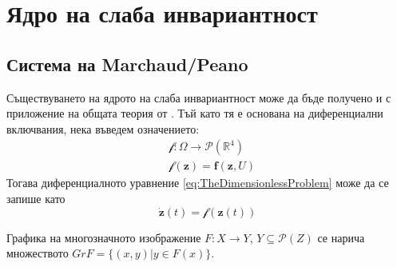 \section{\hspace{1em} Ядро на слаба инвариантност}

\subsection{Система на Marchaud/Peano}
Съществуването на ядрото на слаба инвариантност може да бъде получено и с приложение на общата теория от \cite{Aubin1991}.
Тъй като тя е основана на диференциални включвания, нека въведем означението:
\begin{equation}
  \begin{split}
    &\mathscr{f}:\Omega \rightarrow \mathscr{P}(\mathbb{R}^4)\\
    &\mathscr{f}(\mathbf{z})=\mathbf{f}(\mathbf{z}, U)
  \end{split}
\end{equation}
Тогава диференциалното уравнение \eqref{eq:TheDimensionlessProblem} може да се запише като
\begin{equation}
  \dot{\mathbf{z}}(t) = \mathscr{f}(\mathbf{z}(t))
\end{equation}



\begin{definition} \cite[стр~6]{Aubin1991}
  Графика на многозначното изображение $F:X \rightarrow Y$, $Y \subseteq \mathscr{P}(Z)$ се нарича множеството $Gr F = \{(x, y) \vert y \in F(x)\}$.
\end{definition}

